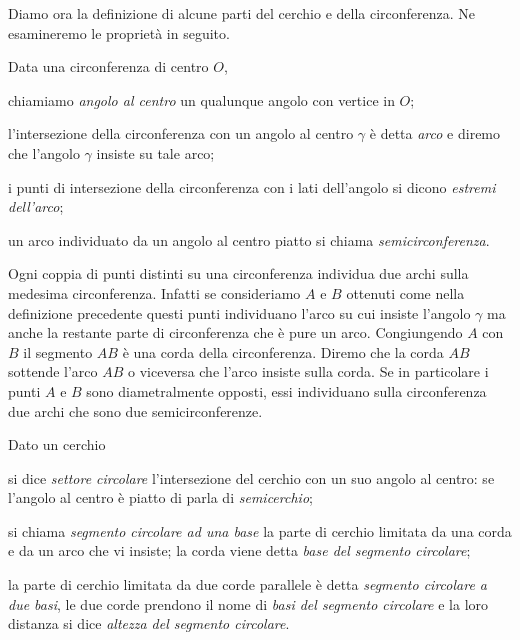 Diamo ora la definizione di alcune parti del cerchio e della 
circonferenza. Ne esamineremo le proprietà in seguito.
\begin{definizione}
Data una circonferenza di centro $O$,
\begin{itemize*}
\item chiamiamo \emph{angolo al centro} un qualunque angolo con 
vertice in $O$;
\item l'intersezione della circonferenza con un angolo al centro 
$\gamma$ è detta \emph{arco} e diremo che l'angolo $\gamma$ insiste 
su tale arco;
\item i punti di intersezione della circonferenza con i lati 
dell'angolo si dicono \emph{estremi dell'arco};
\item un arco individuato da un angolo al centro piatto si chiama 
\emph{semicirconferenza}.
\end{itemize*}
\end{definizione}

\noindent\begin{minipage}{0.6\textwidth}\parindent15pt
Ogni coppia di punti distinti su una circonferenza individua due 
archi sulla medesima circonferenza. Infatti se consideriamo $A$ e $B$ 
ottenuti come nella definizione precedente questi punti individuano 
l'arco su cui insiste l'angolo $\gamma$ ma anche la restante parte di 
circonferenza che è pure un arco.
Congiungendo $A$ con $B$ il segmento $AB$ è una corda della 
circonferenza. Diremo che la corda $AB$ sottende l'arco $AB$ o 
viceversa che l'arco insiste sulla corda.
Se in particolare i punti $A$ e $B$ sono diametralmente opposti, essi 
individuano sulla circonferenza due archi che sono due 
semicirconferenze.
\end{minipage}\hfil
\begin{minipage}{0.4\textwidth}
  \centering
\end{minipage}

\begin{definizione}Dato un cerchio
\begin{itemize*}
\item si dice \emph{settore circolare} l'intersezione del cerchio con 
un suo angolo al centro: se l'angolo al centro è piatto di parla di 
\emph{semicerchio};
\item si chiama \emph{segmento circolare ad una base} la parte di 
cerchio limitata da una corda e da un arco che vi insiste; la corda 
viene detta \emph{base del segmento circolare};
\item la parte di cerchio limitata da due corde parallele è detta 
\emph{segmento circolare a due basi}, le due corde prendono il nome 
di \emph{basi del segmento circolare} e la loro distanza si dice 
\emph{altezza del segmento circolare}.
\end{itemize*}
\end{definizione}

